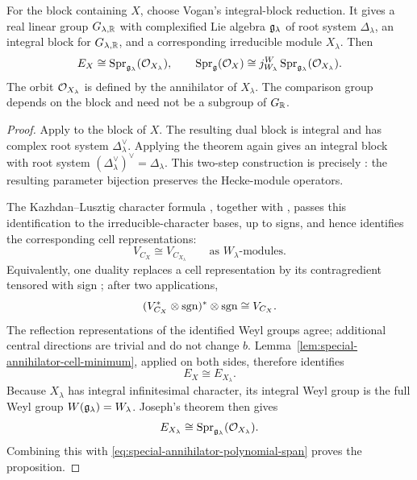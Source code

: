 \begin{prop}
\label{prop:special-annihilator-integral-reduction}
For the block containing $X$, choose Vogan's integral-block reduction.
It gives a real linear group $G_{\lambda,\mathbb{R}}$ with complexified Lie
algebra $\mathfrak{g}_\lambda$ of root system $\Delta_\lambda$, an integral
block for $G_{\lambda,\mathbb{R}}$, and a corresponding irreducible module
$X_\lambda$. Then
\begin{equation}\label{eq:special-annihilator-integral-reduction}
  E_X\cong\operatorname{Spr}_{\mathfrak{g}_\lambda}(\mathcal{O}_{X_\lambda}),
  \qquad
  \operatorname{Spr}_{\mathfrak{g}}(\mathcal{O}_X)
  \cong j_{W_\lambda}^{W}
        \operatorname{Spr}_{\mathfrak{g}_\lambda}(\mathcal{O}_{X_\lambda}).
\end{equation}
The orbit $\mathcal{O}_{X_\lambda}$ is defined by the annihilator of
$X_\lambda$. The comparison group depends on the block and need not
be a subgroup of $G_{\mathbb{R}}$.
\end{prop}

\begin{proof}
Apply \cite[Thm.~11.9]{Vogan1982} to the block of $X$. The resulting
dual block is integral and has complex root system
$\Delta_\lambda^\vee$. Applying the theorem again gives an integral
block with root system
$(\Delta_\lambda^\vee)^\vee=\Delta_\lambda$.
This two-step construction is precisely
\cite[Lem.~12.6]{Vogan1982}: the resulting parameter bijection
preserves the Hecke-module operators.

The Kazhdan--Lusztig character formula \cite{Vogan1983}, together with
\cite[Lem.~14.5]{Vogan1982}, passes this identification to the
irreducible-character bases, up to signs, and hence identifies the
corresponding cell representations:
\[
  V_{C_X}\cong V_{C_{X_\lambda}}
  \qquad\text{as }W_\lambda\text{-modules}.
\]
Equivalently, one duality replaces a cell representation by its
contragredient tensored with sign
\cite[Cor.~14.9]{Vogan1982}; after two applications,
\[
  (V_{C_X}^{*}\otimes\operatorname{sgn})^{*}\otimes\operatorname{sgn}
  \cong V_{C_X}.
\]
The reflection representations of the identified Weyl groups agree;
additional central directions are trivial and do not change $b$.
Lemma~\ref{lem:special-annihilator-cell-minimum}, applied on both
sides, therefore identifies
\[
  E_X\cong E_{X_\lambda}.
\]
Because $X_\lambda$ has integral infinitesimal character, its integral
Weyl group is the full Weyl group $W(\mathfrak{g}_\lambda)=W_\lambda$.
Joseph's theorem then gives
\[
  E_{X_\lambda}
  \cong\operatorname{Spr}_{\mathfrak{g}_\lambda}(\mathcal{O}_{X_\lambda}).
\]
Combining this with
\eqref{eq:special-annihilator-polynomial-span} proves the proposition.
\end{proof}


